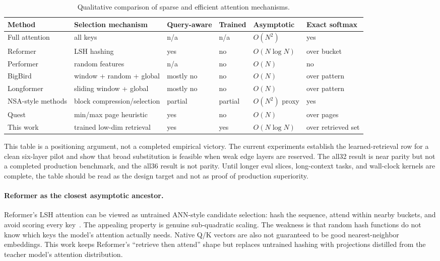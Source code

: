 \documentclass[10pt]{article}
\begin{document}
\begin{table}[h]
\centering
\caption{Qualitative comparison of sparse and efficient attention mechanisms.}
\label{tab:related-properties}
\begin{tabular}{llllll}
\toprule
Method & Selection mechanism & Query-aware & Trained & Asymptotic & Exact softmax\\
\midrule
Full attention & all keys & n/a & n/a & $O(N^2)$ & yes\\
Reformer & LSH hashing & yes & no & $O(N\log N)$ & over bucket\\
Performer & random features & n/a & no & $O(N)$ & no\\
BigBird & window + random + global & mostly no & no & $O(N)$ & over pattern\\
Longformer & sliding window + global & mostly no & no & $O(N)$ & over pattern\\
NSA-style methods & block compression/selection & partial & partial & $O(N^2)$ proxy & yes\\
Quest & min/max page heuristic & yes & no & $O(N)$ & over pages\\
This work & trained low-dim retrieval & yes & yes & $O(N\log N)$ & over retrieved set\\
\bottomrule
\end{tabular}
\end{table}

This table is a positioning argument, not a completed empirical victory. The
current experiments establish the learned-retrieval row for a clean six-layer
pilot and show that broad substitution is feasible when weak edge layers are
reserved. The all32 result is near parity but not a completed production
benchmark, and the all36 result is not parity. Until longer eval slices,
long-context tasks, and wall-clock kernels are complete, the table should be
read as the design target and not as proof of production superiority.

\paragraph{Reformer as the closest asymptotic ancestor.}
Reformer's LSH attention can be viewed as untrained ANN-style candidate
selection: hash the sequence, attend within nearby buckets, and avoid scoring
every key~\citep{kitaev2020reformer}. The appealing property is genuine
sub-quadratic scaling. The weakness is that random hash functions do not know
which keys the model's attention actually needs. Native Q/K vectors are also not
guaranteed to be good nearest-neighbor embeddings. This work keeps Reformer's
``retrieve then attend'' shape but replaces untrained hashing with projections
distilled from the teacher model's attention distribution.
\end{document}
